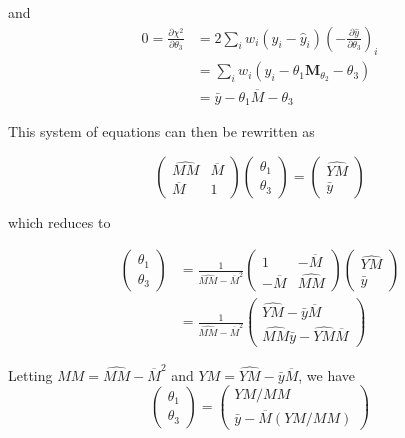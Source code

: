 \documentclass[apj]{emulateapj}
\newcommand{\Mshft}{\mathbf{M}_{\theta_2}}
\newcommand{\MMhat}{\widehat{MM}}
\newcommand{\YMhat}{\widehat{YM}}
\newcommand{\Mbar}{\overline{M}}
\begin{document}
and
\begin{align}
0 = \frac{\partial\chi^2}{\partial\theta_3} &= 2\sum_iw_i(y_i - \hat{y}_i)\left(-\frac{\partial\hat{y}}{\partial\theta_3}\right)_i\\
    &= \sum_iw_i(y_i - \theta_1\Mshft - \theta_3)\\
    &= \bar{y} - \theta_1 \Mbar - \theta_3
\end{align}

This system of equations can then be rewritten as

\begin{equation}
\begin{pmatrix} \MMhat & \Mbar \\ \Mbar & 1 \end{pmatrix}
\begin{pmatrix} \theta_1 \\ \theta_3 \end{pmatrix}
= 
\begin{pmatrix} \YMhat \\ \bar{y}\end{pmatrix}
\end{equation}

which reduces to 

\begin{align}
\begin{pmatrix} \theta_1 \\ \theta_3 \end{pmatrix}
&= 
\frac{1}{\MMhat - \Mbar^2}
\begin{pmatrix} 1 & -\Mbar \\ -\Mbar & \MMhat \end{pmatrix}
\begin{pmatrix} \YMhat \\ \bar{y}\end{pmatrix}\\
&= 
\frac{1}{\MMhat - \Mbar^2}
\begin{pmatrix} \YMhat - \bar{y}\Mbar \\ \MMhat\bar{y} - \YMhat\Mbar \end{pmatrix}
\end{align}

Letting $MM = \MMhat - \Mbar^2$ and $YM = \YMhat - \bar{y}\Mbar$, we have
\begin{equation}
\begin{pmatrix} \theta_1 \\ \theta_3 \end{pmatrix}
= 
\begin{pmatrix} YM / MM \\ \bar{y} - \Mbar (YM / MM)\end{pmatrix}
\end{equation}
\end{document}
